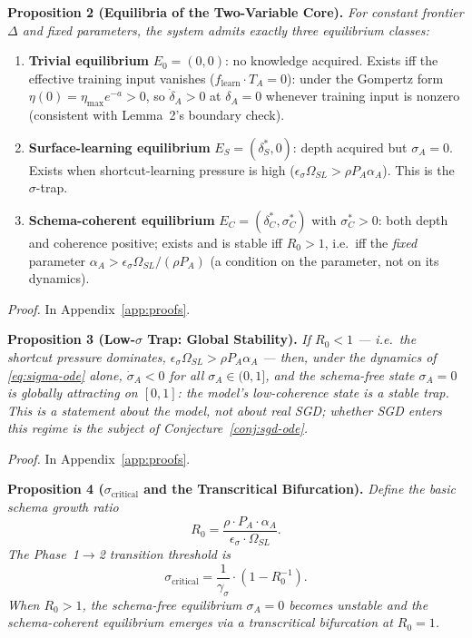 \documentclass{article}
\theoremstyle{definition}
\begin{document}
\textbf{Proposition 2 (Equilibria of the Two-Variable Core).}
\emph{For constant frontier $\Delta$ and fixed parameters, the system
admits exactly three equilibrium classes:}
\begin{enumerate}[nosep]
\item \textbf{Trivial equilibrium} $E_0 = (0, 0)$: no knowledge
  acquired. Exists iff the effective training input vanishes
  ($f_{\text{learn}} \cdot T_A = 0$): under the Gompertz form
  $\eta(0) = \eta_{\max} e^{-a} > 0$, so $\dot{\delta}_A > 0$ at
  $\delta_A = 0$ whenever training input is nonzero (consistent with
  Lemma~2's boundary check).
\item \textbf{Surface-learning equilibrium}
  $E_S = (\delta_S^*, 0)$: depth acquired but $\sigma_A = 0$. Exists
  when shortcut-learning pressure is high ($\epsilon_\sigma \Omega_{SL} >
  \rho P_A \alpha_A$). This is the $\sigma$-trap.
\item \textbf{Schema-coherent equilibrium}
  $E_C = (\delta_C^*, \sigma_C^*)$ with $\sigma_C^* > 0$: both depth and
  coherence positive; exists and is stable iff $R_0 > 1$, i.e.\ iff the
  \emph{fixed} parameter $\alpha_A > \epsilon_\sigma \Omega_{SL} /
  (\rho P_A)$ (a condition on the parameter, not on its dynamics).
\end{enumerate}

\emph{Proof.} In Appendix~\ref{app:proofs}.

\textbf{Proposition 3 (Low-$\sigma$ Trap: Global Stability).}
\emph{If $R_0 < 1$ --- i.e.\ the shortcut pressure dominates,
$\epsilon_\sigma \Omega_{SL} > \rho P_A \alpha_A$ --- then, under the
dynamics of \eqref{eq:sigma-ode} alone, $\dot{\sigma}_A < 0$ for all
$\sigma_A \in (0,1]$, and the schema-free state $\sigma_A = 0$ is
\emph{globally} attracting on $[0,1]$: the model's low-coherence state
is a stable trap. This is a statement about the model, not about real
SGD; whether SGD enters this regime is the subject of
Conjecture~\ref{conj:sgd-ode}.}

\emph{Proof.} In Appendix~\ref{app:proofs}.

\textbf{Proposition 4 ($\sigma_{\text{critical}}$ and the Transcritical
Bifurcation).}
\emph{Define the basic schema growth ratio
\begin{equation}
R_0 = \frac{\rho \cdot P_A \cdot \alpha_A}{\epsilon_\sigma \cdot \Omega_{SL}}.
\end{equation}
The Phase~1$\to$2 transition threshold is
\begin{equation}\label{eq:sigma-critical}
\sigma_{\text{critical}} = \frac{1}{\gamma_\sigma} \cdot \left(1 - R_0^{-1}\right).
\end{equation}
When $R_0 > 1$, the schema-free equilibrium $\sigma_A = 0$ becomes
unstable and the schema-coherent equilibrium emerges via a
\emph{transcritical} bifurcation at $R_0 = 1$.}
\end{document}
